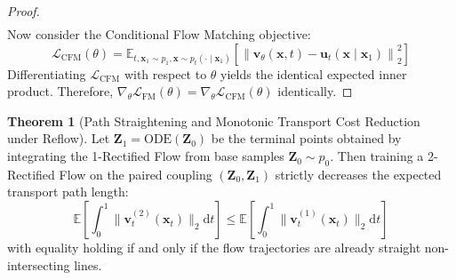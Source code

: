 \documentclass[11pt,a4paper]{article}
\theoremstyle{definition}
\newtheorem{theorem}{\textbf{Theorem}}[section]
\begin{document}
\begin{proof}
{\begin{align}
\end{align}
}
Now consider the Conditional Flow Matching objective:
{\boldmath
\begin{equation}
\mathcal{L}_{\text{CFM}}(\theta) = \mathbb{E}_{t, \mathbf{x}_1 \sim p_1, \mathbf{x} \sim p_t(\cdot \mid \mathbf{x}_1)}\left[ \left\| \mathbf{v}_\theta(\mathbf{x}, t) - \mathbf{u}_t(\mathbf{x} \mid \mathbf{x}_1) \right\|_2^2 \right]
\end{equation}
}
Differentiating $\mathcal{L}_{\text{CFM}}$ with respect to $\theta$ yields the identical expected inner product. Therefore, $\nabla_\theta \mathcal{L}_{\text{FM}}(\theta) = \nabla_\theta \mathcal{L}_{\text{CFM}}(\theta)$ identically.
\end{proof}

\begin{theorem}[Path Straightening and Monotonic Transport Cost Reduction under Reflow]
Let $\mathbf{Z}_1 = \text{ODE}(\mathbf{Z}_0)$ be the terminal points obtained by integrating the 1-Rectified Flow from base samples $\mathbf{Z}_0 \sim p_0$. Then training a 2-Rectified Flow on the paired coupling $(\mathbf{Z}_0, \mathbf{Z}_1)$ strictly decreases the expected transport path length:
{\boldmath
\begin{equation}
\mathbb{E}\left[ \int_0^1 \|\mathbf{v}^{(2)}_t(\mathbf{x}_t)\|_2 \mathrm{d}t \right] \le \mathbb{E}\left[ \int_0^1 \|\mathbf{v}^{(1)}_t(\mathbf{x}_t)\|_2 \mathrm{d}t \right]
\end{equation}
}
with equality holding if and only if the flow trajectories are already straight non-intersecting lines.
\end{theorem}
\end{document}
